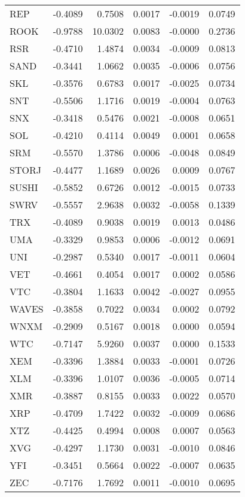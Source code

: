 \begin{table}[ht]
\begin{tabular}{lrrrrr}
REP & -0.4089 & 0.7508 & 0.0017 & -0.0019 & 0.0749 \\
ROOK & -0.9788 & 10.0302 & 0.0083 & -0.0000 & 0.2736 \\
RSR & -0.4710 & 1.4874 & 0.0034 & -0.0009 & 0.0813 \\
SAND & -0.3441 & 1.0662 & 0.0035 & -0.0006 & 0.0756 \\
SKL & -0.3576 & 0.6783 & 0.0017 & -0.0025 & 0.0734 \\
SNT & -0.5506 & 1.1716 & 0.0019 & -0.0004 & 0.0763 \\
SNX & -0.3418 & 0.5476 & 0.0021 & -0.0008 & 0.0651 \\
SOL & -0.4210 & 0.4114 & 0.0049 & 0.0001 & 0.0658 \\
SRM & -0.5570 & 1.3786 & 0.0006 & -0.0048 & 0.0849 \\
STORJ & -0.4477 & 1.1689 & 0.0026 & 0.0009 & 0.0767 \\
SUSHI & -0.5852 & 0.6726 & 0.0012 & -0.0015 & 0.0733 \\
SWRV & -0.5557 & 2.9638 & 0.0032 & -0.0058 & 0.1339 \\
TRX & -0.4089 & 0.9038 & 0.0019 & 0.0013 & 0.0486 \\
UMA & -0.3329 & 0.9853 & 0.0006 & -0.0012 & 0.0691 \\
UNI & -0.2987 & 0.5340 & 0.0017 & -0.0011 & 0.0604 \\
VET & -0.4661 & 0.4054 & 0.0017 & 0.0002 & 0.0586 \\
VTC & -0.3804 & 1.1633 & 0.0042 & -0.0027 & 0.0955 \\
WAVES & -0.3858 & 0.7022 & 0.0034 & 0.0002 & 0.0792 \\
WNXM & -0.2909 & 0.5167 & 0.0018 & 0.0000 & 0.0594 \\
WTC & -0.7147 & 5.9260 & 0.0037 & 0.0000 & 0.1533 \\
XEM & -0.3396 & 1.3884 & 0.0033 & -0.0001 & 0.0726 \\
XLM & -0.3396 & 1.0107 & 0.0036 & -0.0005 & 0.0714 \\
XMR & -0.3887 & 0.8155 & 0.0033 & 0.0022 & 0.0570 \\
XRP & -0.4709 & 1.7422 & 0.0032 & -0.0009 & 0.0686 \\
XTZ & -0.4425 & 0.4994 & 0.0008 & 0.0007 & 0.0563 \\
XVG & -0.4297 & 1.1730 & 0.0031 & -0.0010 & 0.0846 \\
YFI & -0.3451 & 0.5664 & 0.0022 & -0.0007 & 0.0635 \\
ZEC & -0.7176 & 1.7692 & 0.0011 & -0.0010 & 0.0695 \\

\end{tabular}
\end{table}
